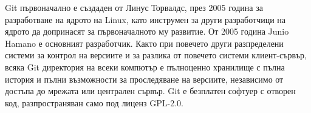 Git първоначално е създаден от Линус Торвалдс, през 2005 година за разработване
на ядрото на Linux, като инструмен за други разработчици на ядрото да
допринасят за първоначалното му развитие. От 2005 година Junio Hamano е основният
разработчик. Както при повечето други разпределени системи за контрол на версиите
и за разлика от повечето системи клиент-сървър, всяка Git директория на всеки
компютър е пълноценно хранилище с пълна история и пълни възможности за
проследяване на версиите, независимо от достъпа до мрежата или централен
сървър. Git е безплатен софтуер с отворен код, разпространяван само под лиценз
GPL-2.0. \cite{git_wikipedia}
